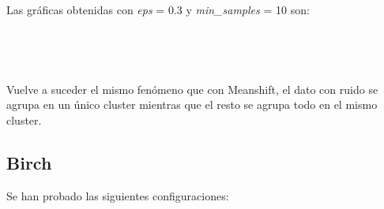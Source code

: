 \documentclass[paper=a4, fontsize=12pt]{article} %
\numberwithin{equation}{section} %
\numberwithin{figure}{section} %
\numberwithin{table}{section} %
\begin{document}
Las gráficas obtenidas con \textit{eps} = 0.3 y \textit{min\_samples} = 10 son:

\begin{figure}[H]
    \centering
    \mbox {
    }
\end{figure}

\begin{figure}[H]
    \centering
    \mbox {
    }
\end{figure}

Vuelve a suceder el mismo fenómeno que con Meanshift, el dato con ruido se agrupa en un único cluster mientras que el resto se agrupa todo en el mismo cluster. 
\newpage
\subsection{Birch}

Se han probado las siguientes configuraciones:
\end{document}
